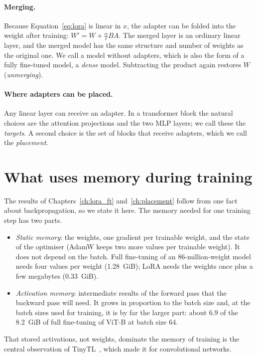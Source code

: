 \paragraph{Merging.} Because Equation~\ref{eq:lora} is linear in $x$, the adapter can be folded into the weight
after training: $W' = W + \frac{\alpha}{r}BA$. The merged layer is an ordinary linear layer, and the merged model
has the same structure and number of weights as the original one. We call a model without adapters, which is also
the form of a fully fine-tuned model, a \emph{dense} model. Subtracting the product again restores $W$
(\emph{unmerging}).

\paragraph{Where adapters can be placed.} Any linear layer can receive an adapter. In a transformer block the
natural choices are the attention projections and the two MLP layers; we call these the \emph{targets}. A second
choice is the set of blocks that receive adapters, which we call the \emph{placement}.

\section{What uses memory during training}
\label{sec:bg_memory}

The results of Chapters~\ref{ch:lora_ft} and~\ref{ch:placement} follow from one fact about backpropagation, so we
state it here. The memory needed for one training step has two parts.
\begin{itemize}
  \item \emph{Static memory}: the weights, one gradient per trainable weight, and the state of the optimiser (AdamW
        \cite{loshchilov2019adamw} keeps two more values per trainable weight). It does not depend on the batch.
        Full fine-tuning of an 86-million-weight model needs four values per weight (1.28~GiB); LoRA needs the
        weights once plus a few megabytes (0.33~GiB).
  \item \emph{Activation memory}: intermediate results of the forward pass that the backward pass will need. It
        grows in proportion to the batch size and, at the batch sizes used for training, it is by far the larger
        part: about 6.9 of the 8.2~GiB of full fine-tuning of ViT-B at batch size 64.
\end{itemize}
That stored activations, not weights, dominate the memory of training is the central observation of
TinyTL~\cite{cai2020tinytl}, which made it for convolutional networks.

